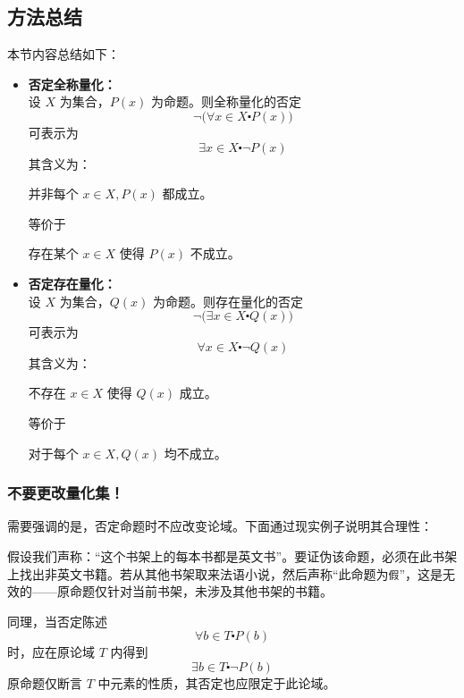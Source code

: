 \subsection{方法总结}

本节内容总结如下：
\begin{itemize}
    \item \textbf{否定全称量化：} \\
        设 $X$ 为集合，$P(x)$ 为命题。则全称量化的否定
        \[\neg \big(\forall x \in X \centerdot P(x)\big)\]
        可表示为
        \[\exists x \in X \centerdot \neg P(x)\]
        其含义为：
        \begin{center}
            并非每个 $x \in X, P(x)$ 都成立。
        \end{center}
        等价于
        \begin{center}
            存在某个 $x \in X$ 使得 $P(x)$ 不成立。
        \end{center}
    \item \textbf{否定存在量化：} \\
        设 $X$ 为集合，$Q(x)$ 为命题。则存在量化的否定
        \[\neg \big(\exists x \in X \centerdot Q(x)\big)\]
        可表示为
        \[\forall x \in X \centerdot \neg Q(x)\]
        其含义为：
        \begin{center}
            不存在 $x \in X$ 使得 $Q(x)$ 成立。
        \end{center}
        等价于
        \begin{center}
            对于每个 $x \in X, Q(x)$ 均不成立。
        \end{center}
\end{itemize}

\subsubsection*{不要更改量化集！}

需要强调的是，否定命题时不应改变论域。下面通过现实例子说明其合理性：

假设我们声称：``这个书架上的每本书都是英文书''。要证伪该命题，必须在此书架上找出非英文书籍。若从其他书架取来法语小说，然后声称``此命题为\verb|假|''，这是无效的——原命题仅针对当前书架，未涉及其他书架的书籍。

同理，当否定陈述
\[\forall b \in T \centerdot P(b)\]
时，应在原论域 $T$ 内得到
\[\exists b \in T \centerdot \neg P(b)\]
原命题仅断言 $T$ 中元素的性质，其否定也应限定于此论域。
